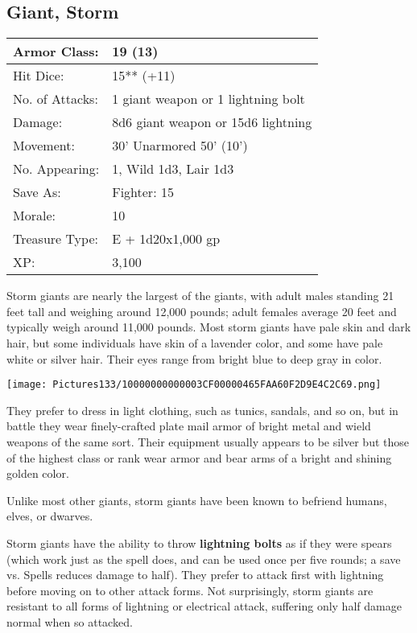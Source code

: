 \documentclass[a4paper,twoside,openany,10pt]{book}
\begin{document}
\begin{multicols}{2}
\subsection*{Giant, Storm}\label{giant-storm}

\begin{tabularx}{0.48\textwidth}{@{}lX@{}}
Armor Class: & 19 (13) \\\hline
Hit Dice: & 15** (+11) \\\hline
No. of Attacks: & 1 giant weapon or 1 lightning bolt \\\hline
Damage: & 8d6 giant weapon or 15d6 lightning \\\hline
Movement: & 30' Unarmored 50'
(10') \\\hline
No. Appearing: & 1, Wild 1d3, Lair 1d3 \\\hline
Save As: & Fighter: 15 \\\hline
Morale: & 10 \\\hline
Treasure Type: & E + 1d20x1,000 gp \\\hline
XP: & 3,100 \\\hline
\end{tabularx}\medskip

Storm giants are nearly the largest of the giants, with adult males standing 21 feet tall and weighing around 12,000 pounds; adult females average 20 feet and typically weigh around 11,000 pounds. Most storm giants have pale skin and dark hair, but some individuals have skin of a lavender color, and some have pale white or silver hair. Their eyes range from bright blue to deep gray in color.

\begin{center}
	\texttt{[image: Pictures133/10000000000003CF00000465FAA60F2D9E4C2C69.png]}
\end{center}

They prefer to dress in light clothing, such as tunics, sandals, and so on, but in battle they wear finely-crafted plate mail armor of bright metal and wield weapons of the same sort. Their equipment usually appears to be silver but those of the highest class or rank wear armor and bear arms of a bright and shining golden color.

Unlike most other giants, storm giants have been known to befriend humans, elves, or dwarves.

Storm giants have the ability to throw \textbf{lightning bolts} as if they were spears (which work just as the spell does, and can be used once per five rounds; a save vs. Spells reduces damage to half). They prefer to attack first with lightning before moving on to other attack forms. Not surprisingly, storm giants are resistant to all forms of lightning or electrical attack, suffering only half damage normal when so attacked.


\end{multicols}
\end{document}

